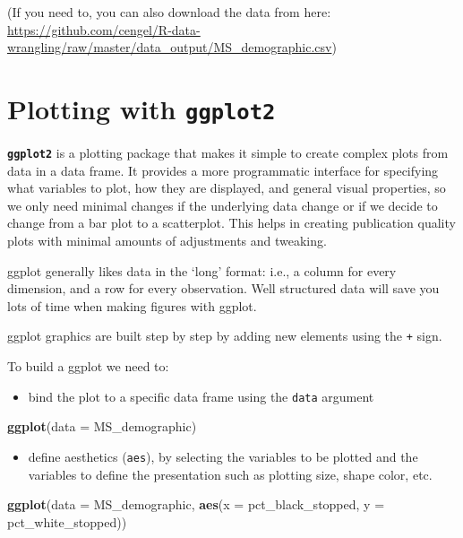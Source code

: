 \documentclass[]{book}
\newenvironment{Shaded}{\begin{snugshade}}{\end{snugshade}}
\newcommand{\DataTypeTok}[1]{\textcolor[rgb]{0.13,0.29,0.53}{#1}}
\newcommand{\KeywordTok}[1]{\textcolor[rgb]{0.13,0.29,0.53}{\textbf{#1}}}
\newcommand{\NormalTok}[1]{#1}
\providecommand{\tightlist}{%
  \setlength{\itemsep}{0pt}\setlength{\parskip}{0pt}}
\begin{document}
(If you need to, you can also download the data from here: \url{https://github.com/cengel/R-data-wrangling/raw/master/data_output/MS_demographic.csv})

\hypertarget{plotting-with-ggplot2}{%
\section{\texorpdfstring{Plotting with \textbf{\texttt{ggplot2}}}{Plotting with ggplot2}}\label{plotting-with-ggplot2}}

\textbf{\texttt{ggplot2}} is a plotting package that makes it simple to create complex plots
from data in a data frame. It provides a more programmatic interface for
specifying what variables to plot, how they are displayed, and general visual
properties, so we only need minimal changes if the underlying data change or if
we decide to change from a bar plot to a scatterplot. This helps in creating
publication quality plots with minimal amounts of adjustments and tweaking.

ggplot generally likes data in the `long' format: i.e., a column for every dimension, and a row for every observation. Well structured data will save you lots of time when making figures with ggplot.

ggplot graphics are built step by step by adding new elements using the \texttt{+} sign.

To build a ggplot we need to:

\begin{itemize}
\tightlist
\item
  bind the plot to a specific data frame using the \texttt{data} argument
\end{itemize}

\begin{Shaded}
\begin{Highlighting}[]
\KeywordTok{ggplot}\NormalTok{(}\DataTypeTok{data =}\NormalTok{ MS_demographic)}
\end{Highlighting}
\end{Shaded}

\begin{itemize}
\tightlist
\item
  define aesthetics (\texttt{aes}), by selecting the variables to be plotted and the variables to define the presentation such as plotting size, shape color, etc.
\end{itemize}

\begin{Shaded}
\begin{Highlighting}[]
\KeywordTok{ggplot}\NormalTok{(}\DataTypeTok{data =}\NormalTok{ MS_demographic, }\KeywordTok{aes}\NormalTok{(}\DataTypeTok{x =}\NormalTok{ pct_black_stopped, }\DataTypeTok{y =}\NormalTok{ pct_white_stopped))}
\end{Highlighting}
\end{Shaded}
\end{document}
